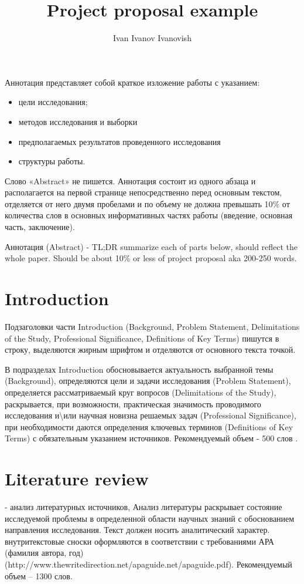\documentclass[PI]{ProjectProposal}
\title{Project proposal example}
\author{Ivan Ivanov Ivanovish}
\begin{document}
\maketitle
Аннотация представляет собой краткое изложение работы с указанием:
\begin{itemize}
  \item цели исследования;
  \item методов исследования и выборки
  \item предполагаемых результатов проведенного исследования
  \item структуры работы.
\end{itemize}
Слово «Abstract» не пишется. Аннотация состоит из одного абзаца и располагается на первой странице непосредственно перед основным текстом, отделяется от него двумя пробелами и по объему не должна превышать 10\% от количества слов в основных информативных частях работы (введение, основная часть, заключение).

Аннотация (Abstract) - TL;DR summarize each of parts below, should reflect the whole paper. Should be about 10\% or less of project proposal aka 200-250 words.
\chapter*{Introduction}
Подзаголовки части Introduction (Background, Problem Statement, Delimitations of the Study, Professional Significance, Definitions of Key Terms) пишутся в строку, выделяются жирным шрифтом и отделяются от основного текста точкой.

В подразделах Introduction обосновывается актуальность выбранной темы (Background), определяются цели и задачи исследования (Problem Statement), определяется рассматриваемый круг вопросов (Delimitations of the Study), раскрывается, при возможности, практическая значимость проводимого исследования и\textbackslash или научная новизна решаемых задач (Professional Significance), при необходимости даются определения ключевых терминов (Definitions of Key Terms) с обязательным указанием источников. Рекомендуемый объем - 500 слов \cite{HSEDocuments}.
\chapter*{Literature review}
- анализ литературных источников,
Анализ литературы раскрывает состояние исследуемой проблемы в определенной области научных знаний с обоснованием направления исследования. Текст должен носить аналитический характер. внутритекстовые сноски оформляются в соответствии с требованиями АРА (фамилия автора, год) (http://www.thewritedirection.net/apaguide.net/apaguide.pdf). Рекомендуемый объем – 1300 слов.
\end{document}
